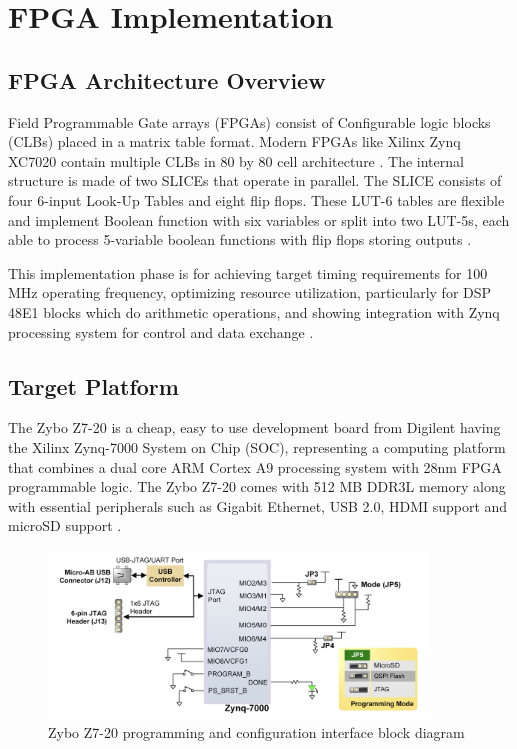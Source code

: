 
\chapter{FPGA Implementation}
\label{chap:fpga_implementation}

\section{FPGA Architecture Overview}
\label{sec:fpga_overview}

Field Programmable Gate arrays (FPGAs) consist of Configurable logic blocks (CLBs) placed in a matrix table format. Modern FPGAs like Xilinx Zynq XC7020 contain multiple CLBs in 80 by 80 cell architecture \cite{ref21}. The internal structure is made of two SLICEs that operate in parallel. The SLICE consists of four 6-input Look-Up Tables and eight flip flops. These LUT-6 tables are flexible and implement Boolean function with six variables or split into two LUT-5s, each able to process 5-variable boolean functions with flip flops storing outputs \cite{ref22}.

This implementation phase is for achieving target timing requirements for 100 MHz operating frequency, optimizing resource utilization, particularly for DSP 48E1 blocks which do arithmetic operations, and showing integration with Zynq processing system for control and data exchange \cite{ref21}.

\section{Target Platform}
\label{sec:target_platform}

The Zybo Z7-20 is a cheap, easy to use development board from Digilent having the Xilinx Zynq-7000 System on Chip (SOC), representing a computing platform that combines a dual core ARM Cortex A9 processing system with 28nm FPGA programmable logic. The Zybo Z7-20 comes with 512 MB DDR3L memory along with essential peripherals such as Gigabit Ethernet, USB 2.0, HDMI support and microSD support \cite{ref25}.

\begin{figure}[htbp]
    \centering
    \includegraphics[width=0.9\textwidth]{figures/Zybopin.png}
    \caption{Zybo Z7-20 programming and configuration interface block diagram}
    \label{fig:zybo_pin_diagram}
\end{figure}

